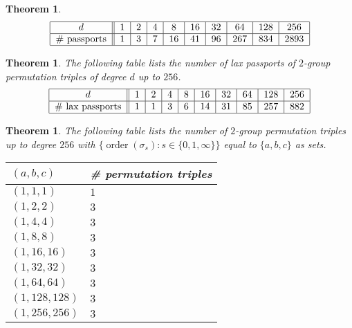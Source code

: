 \documentclass{dcthesis}
\DeclareMathOperator{\order}{order}
\numberwithin{equation}{section}
\newtheorem{theorem}[equation]{Theorem}
\theoremstyle{definition}
\theoremstyle{remark}
\begin{document}
{{{\begin{theorem}
\begin{equation}
\begin{tabular}{|c||c|c|c|c|c|c|c|c|c|}
          \hline
          $d$ & $1$ & $2$ & $4$ & $8$ & $16$ & $32$ & $64$ & $128$ & $256$\\
          \hline
          \# passports & $1$ & $3$ & $7$ & $16$ & $41$ & $96$ & $267$ & $834$ & $2893$\\
          \hline
        \end{tabular}
      \end{equation}
    \end{theorem}
    \begin{theorem}\label{thm:laxpassports}
      The following table lists
      the number of lax passports of
      $2$-group permutation triples
      of degree $d$ up to $256$.
      \begin{equation}
        \label{eqn:}
        \begin{tabular}{|c||c|c|c|c|c|c|c|c|c|}
          \hline
          $d$ & $1$ & $2$ & $4$ & $8$ & $16$ & $32$ & $64$ & $128$ & $256$\\
          \hline
          \# lax passports & $1$ & $1$ & $3$ & $6$ & $14$ & $31$ & $85$ & $257$ & $882$\\
          \hline
        \end{tabular}
      \end{equation}
    \end{theorem}
    \begin{theorem}\label{thm:abc}
      The following table lists
      the number of $2$-group
      permutation triples
      up to degree $256$ with
      $\{\order(\sigma_s) : s\in\{0,1,\infty\}\}$
      equal to $\{a,b,c\}$ as sets.
      \begin{longtable}{|l|l|} 
        \hline
        $(a,b,c)$ & \# permutation triples \\
        \hline
        \hline
        $(1,1,1)$ & $1$ \\ \hline
        $(1,2,2)$ & $3$ \\ \hline
        $(1,4,4)$ & $3$ \\ \hline
        $(1,8,8)$ & $3$ \\ \hline
        $(1,16,16)$ & $3$ \\ \hline
        $(1,32,32)$ & $3$ \\ \hline
        $(1,64,64)$ & $3$ \\ \hline
        $(1,128,128)$ & $3$ \\ \hline
        $(1,256,256)$ & $3$ \\ \hline

\end{longtable}
\end{theorem}}}}
\end{document}
